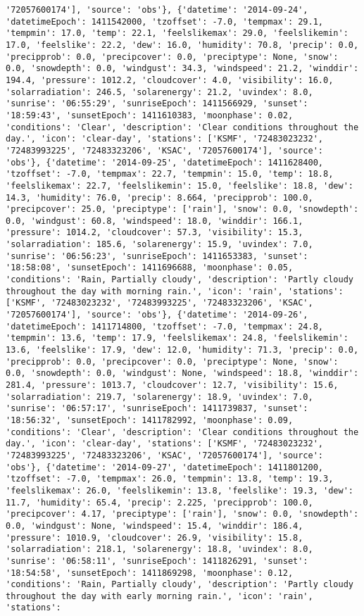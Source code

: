 \documentclass[
  letterpaper,
  DIV=11,
  numbers=noendperiod]{scrartcl}
\begin{document}
\begin{verbatim}
'72057600174'], 'source': 'obs'}, {'datetime': '2014-09-24', 'datetimeEpoch': 1411542000, 'tzoffset': -7.0, 'tempmax': 29.1, 'tempmin': 17.0, 'temp': 22.1, 'feelslikemax': 29.0, 'feelslikemin': 17.0, 'feelslike': 22.2, 'dew': 16.0, 'humidity': 70.8, 'precip': 0.0, 'precipprob': 0.0, 'precipcover': 0.0, 'preciptype': None, 'snow': 0.0, 'snowdepth': 0.0, 'windgust': 34.3, 'windspeed': 21.2, 'winddir': 194.4, 'pressure': 1012.2, 'cloudcover': 4.0, 'visibility': 16.0, 'solarradiation': 246.5, 'solarenergy': 21.2, 'uvindex': 8.0, 'sunrise': '06:55:29', 'sunriseEpoch': 1411566929, 'sunset': '18:59:43', 'sunsetEpoch': 1411610383, 'moonphase': 0.02, 'conditions': 'Clear', 'description': 'Clear conditions throughout the day.', 'icon': 'clear-day', 'stations': ['KSMF', '72483023232', '72483993225', '72483323206', 'KSAC', '72057600174'], 'source': 'obs'}, {'datetime': '2014-09-25', 'datetimeEpoch': 1411628400, 'tzoffset': -7.0, 'tempmax': 22.7, 'tempmin': 15.0, 'temp': 18.8, 'feelslikemax': 22.7, 'feelslikemin': 15.0, 'feelslike': 18.8, 'dew': 14.3, 'humidity': 76.0, 'precip': 8.664, 'precipprob': 100.0, 'precipcover': 25.0, 'preciptype': ['rain'], 'snow': 0.0, 'snowdepth': 0.0, 'windgust': 60.8, 'windspeed': 18.0, 'winddir': 166.1, 'pressure': 1014.2, 'cloudcover': 57.3, 'visibility': 15.3, 'solarradiation': 185.6, 'solarenergy': 15.9, 'uvindex': 7.0, 'sunrise': '06:56:23', 'sunriseEpoch': 1411653383, 'sunset': '18:58:08', 'sunsetEpoch': 1411696688, 'moonphase': 0.05, 'conditions': 'Rain, Partially cloudy', 'description': 'Partly cloudy throughout the day with morning rain.', 'icon': 'rain', 'stations': ['KSMF', '72483023232', '72483993225', '72483323206', 'KSAC', '72057600174'], 'source': 'obs'}, {'datetime': '2014-09-26', 'datetimeEpoch': 1411714800, 'tzoffset': -7.0, 'tempmax': 24.8, 'tempmin': 13.6, 'temp': 17.9, 'feelslikemax': 24.8, 'feelslikemin': 13.6, 'feelslike': 17.9, 'dew': 12.0, 'humidity': 71.3, 'precip': 0.0, 'precipprob': 0.0, 'precipcover': 0.0, 'preciptype': None, 'snow': 0.0, 'snowdepth': 0.0, 'windgust': None, 'windspeed': 18.8, 'winddir': 281.4, 'pressure': 1013.7, 'cloudcover': 12.7, 'visibility': 15.6, 'solarradiation': 219.7, 'solarenergy': 18.9, 'uvindex': 7.0, 'sunrise': '06:57:17', 'sunriseEpoch': 1411739837, 'sunset': '18:56:32', 'sunsetEpoch': 1411782992, 'moonphase': 0.09, 'conditions': 'Clear', 'description': 'Clear conditions throughout the day.', 'icon': 'clear-day', 'stations': ['KSMF', '72483023232', '72483993225', '72483323206', 'KSAC', '72057600174'], 'source': 'obs'}, {'datetime': '2014-09-27', 'datetimeEpoch': 1411801200, 'tzoffset': -7.0, 'tempmax': 26.0, 'tempmin': 13.8, 'temp': 19.3, 'feelslikemax': 26.0, 'feelslikemin': 13.8, 'feelslike': 19.3, 'dew': 11.7, 'humidity': 65.4, 'precip': 2.225, 'precipprob': 100.0, 'precipcover': 4.17, 'preciptype': ['rain'], 'snow': 0.0, 'snowdepth': 0.0, 'windgust': None, 'windspeed': 15.4, 'winddir': 186.4, 'pressure': 1010.9, 'cloudcover': 26.9, 'visibility': 15.8, 'solarradiation': 218.1, 'solarenergy': 18.8, 'uvindex': 8.0, 'sunrise': '06:58:11', 'sunriseEpoch': 1411826291, 'sunset': '18:54:58', 'sunsetEpoch': 1411869298, 'moonphase': 0.12, 'conditions': 'Rain, Partially cloudy', 'description': 'Partly cloudy throughout the day with early morning rain.', 'icon': 'rain', 'stations': 
\end{verbatim}
\end{document}
